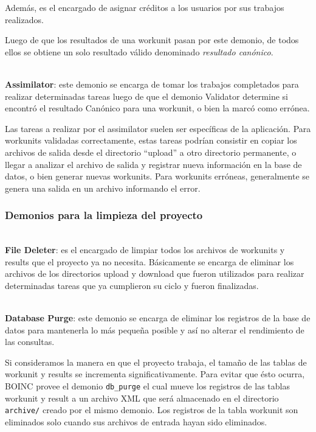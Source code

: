 Además, es el encargado de asignar créditos a los usuarios por sus trabajos realizados.

Luego de que los resultados de una workunit pasan por este demonio, de todos ellos se obtiene un solo resultado válido denominado \textit{resultado canónico}.

\textbf{\\Assimilator}\label{boinc:assimilator}: este demonio se encarga de tomar los trabajos completados para realizar determinadas tareas luego de que el demonio Validator determine si encontró el resultado Canónico para una workunit, o bien la marcó como errónea. 

Las tareas a realizar por el assimilator suelen ser específicas de la aplicación. Para workunits validadas correctamente, estas tareas podrían consistir en copiar los archivos de salida desde el directorio “upload” a otro directorio permanente, o llegar a analizar el archivo de salida y registrar nueva información en la base de datos, o bien generar nuevas workunits. Para workunits erróneas, generalmente se genera una salida en un archivo informando el error.

\subsubsection{Demonios para la limpieza del proyecto}

\textbf{\\File Deleter}: es el encargado de limpiar todos los archivos de workunits y results que el proyecto ya no necesita. Básicamente se encarga de eliminar los archivos de los directorios upload y download que fueron utilizados para realizar determinadas tareas que ya cumplieron su ciclo y fueron finalizadas. 

\textbf{\\Database Purge}: este demonio se encarga de eliminar los registros de la base de datos para mantenerla lo más pequeña posible y así no alterar el rendimiento de las consultas.

Si consideramos la manera en que el proyecto trabaja, el tamaño de las tablas de workunit y results se incrementa significativamente. Para evitar que ésto ocurra, BOINC provee el demonio \texttt{db\_purge} el cual mueve los registros de las tablas workunit y result a un archivo XML que será almacenado en el directorio \texttt{archive/} creado por el mismo demonio. Los registros de la tabla workunit son eliminados solo cuando sus archivos de entrada hayan sido eliminados.


